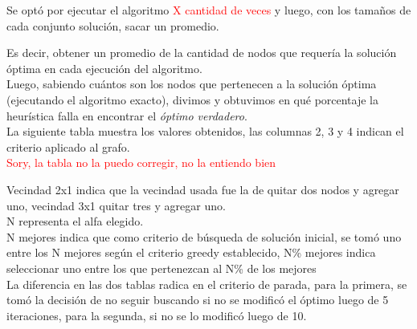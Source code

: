 \bigskip

Se opt\'o por ejecutar el algoritmo \textcolor{red}{X cantidad de veces} y luego, con los tama\~nos de cada conjunto soluci\'on, sacar un promedio.

Es decir, obtener un promedio de la cantidad de nodos que requer\'ia la soluci\'on \'optima en cada ejecuci\'on del algoritmo.\\


Luego, sabiendo cu\'antos son los nodos que pertenecen a la soluci\'on \'optima (ejecutando el algoritmo exacto), divimos y obtuvimos en qu\'e porcentaje la heur\'istica falla en encontrar el \textit{\'optimo verdadero}.\\

La siguiente tabla muestra los valores obtenidos, las columnas 2, 3 y 4 indican el criterio aplicado al grafo.\\

\textcolor{red}{Sory, la tabla no la puedo corregir, no la entiendo bien}

Vecindad 2x1 indica que la vecindad usada fue la de quitar dos nodos y agregar uno, vecindad 3x1 quitar tres y agregar uno.\\

N representa el alfa elegido.\\

N mejores indica que como criterio de b\'usqueda de soluci\'on inicial, se tom\'o uno entre los N mejores seg\'un el criterio greedy establecido, N\% mejores indica seleccionar uno entre los que pertenezcan al N\% de los mejores\\

La diferencia en las dos tablas radica en el criterio de parada, para la primera, se tom\'o la decisi\'on de no seguir buscando si no se modific\'o el \'optimo luego de 5 iteraciones, para la segunda, si no se lo modific\'o luego de 10.\\

